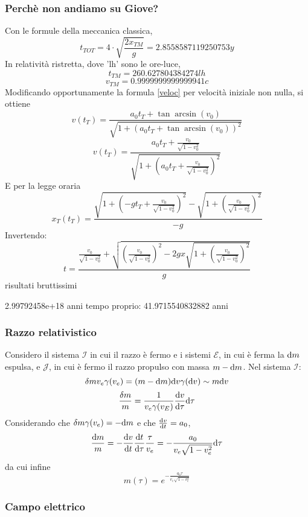 \subsubsection {Perch\`e non andiamo su Giove?}
Con le formule della meccanica classica,
\[ t_{TOT} = 4\cdot \sqrt{\frac{2x_{TM}}{g}} = 2.8558587119250753 y \]
In relativit\`a ristretta, dove 'lh' sono le ore-luce,
\[ t_{TM} = 260.627804384274lh \]
\[ v_{TM} = 0.9999999999999941 c \]
Modificando opportunamente la formula \ref{veloc} per velocit\`a iniziale non nulla, si ottiene
\[ v(t_T) = \frac{a_0 t_T + \tan\arcsin(v_0)          }
	{\sqrt{1+( a_0t_T + \tan\arcsin(v_0)           )^2 }}  \]
\[ v(t_T) = \frac{a_0 t_T + \frac{v_0}{\sqrt{1-v_0^2}} }
	{\sqrt{1+( a_0t_T + \frac{v_0}{\sqrt{1-v_0^2}}  )^2 }}  \]
E per la legge oraria
\[ x_T(t_T) = \frac{\sqrt{1+ (-gt_T + \frac{v_0}{\sqrt{1-v_0^2}})^2 } - 
	\sqrt{1+  (\frac{v_0}{\sqrt{1-v_0^2}})^2}     }{-g} \]
Invertendo:
\[ t = \frac{ \frac{v_0}{\sqrt{1-v_0^2}} + \sqrt{ (\frac{v_0}{\sqrt{1-v_0^2}})^2 - 2gx \sqrt{1+( \frac{v_0}{\sqrt{1-v_0^2}}    )^2     }  } }
             {  g   }\]
\todo risultati bruttissimi

2.99792458e+18  anni
tempo proprio:
41.9715540832882 anni




\subsubsection{Razzo relativistico}
Considero il sistema $\mathcal{I}$ in cui il razzo \`e fermo e i sistemi $\mathcal{E}$, in cui \`e ferma la $\mathrm{d} m$ espulsa, e $\mathcal{J}$, in cui \`e fermo il razzo propulso con massa $m-\mathrm{d} m$. Nel sistema $\mathcal{I}$:
\[ \delta m v_e \gamma(v_e) = (m - \mathrm{d} m) \mathrm{d} v \gamma(\mathrm{d} v) \sim m \mathrm{d} v \]
\[ \frac{\delta m}{m} = \frac{1}{v_e \gamma(v_E)} \frac{\mathrm{d} v}{\mathrm{d}\tau} \mathrm{d}\tau \]
Considerando che \( \delta m \gamma(v_e)  = -\mathrm{d} m \) e che \( \frac{\mathrm{d} v}{\mathrm{d} t} = a_0 \),
\[ \frac{\mathrm{d} m}{m} = -\frac{\mathrm{d} v}{\mathrm{d} t} \frac{\mathrm{d} t}{\mathrm{d} \tau} \frac{\tau}{v_e} = -\frac{a_0}{v_e\sqrt{1-v_e^2}}\mathrm{d} \tau \]
da cui infine
\[ m(\tau) = e^{-\frac{a_0\tau}{v_e \sqrt{1-v_e^2}}} \]

\subsubsection{Campo elettrico}






